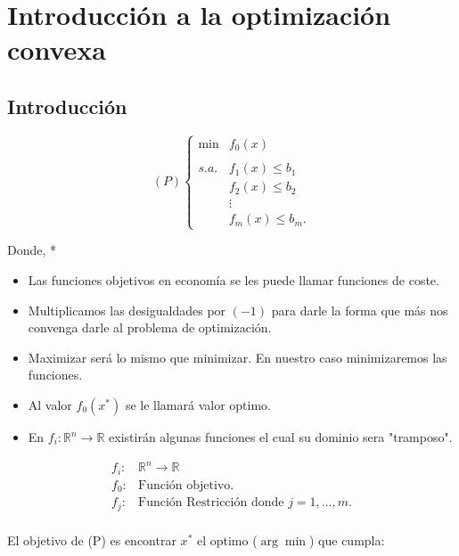 \chapter{Introducción a la optimización convexa}

\begin{paracol}{2}
\section{Introducción}

\begin{tcolorbox}[colback=black!1!white,colframe=white!90!black]
$$
(P)
\left\{
\begin{array}{rl}
    \min & f_0(x)\\\\
    s.a. & f_1(x) \leq b_1\\
	 &f_2(x) \leq b_2\\
	 & \vdots\\
	 & f_m(x) \leq b_m.
\end{array}
\right.
$$
\end{tcolorbox}

Donde,
\switchcolumn[1]*{\noindent \scriptsize
    \begin{itemize}
	\item Las funciones objetivos en economía se les puede llamar funciones de coste.
	\item Multiplicamos las desigualdades por $(-1)$ para darle la forma que más nos convenga darle al problema de optimización.
	\item Maximizar será lo mismo que minimizar. En nuestro caso minimizaremos las funciones. 
	\item Al valor $f_0(x^*)$ se le llamará valor optimo.
	\item En $f_i:  \mathbb{R}^n \rightarrow \mathbb{R}$ existirán algunas funciones el cual su dominio sera "tramposo".
    \end{itemize}
}

\switchcolumn[0]
$$
\begin{array}{rl}
    f_i: & \mathbb{R}^n \rightarrow \mathbb{R}\\
    f_0 : & \mbox{Función objetivo.}\\
    f_j : & \mbox{Función Restricción donde }j=1,\ldots,m.\\
\end{array}
$$

El objetivo de (P) es encontrar $x^*$ el optimo ($\arg\min$) que cumpla:


\end{paracol}
